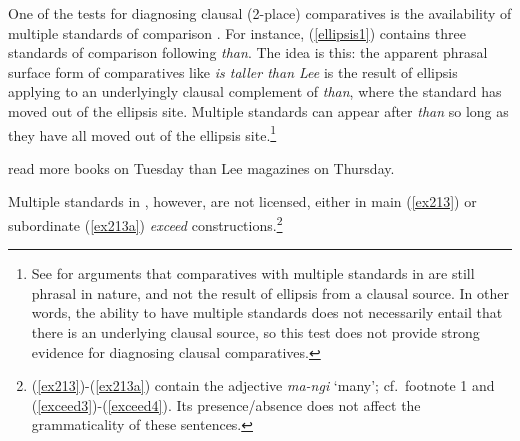 \documentclass[output=paper,
modfonts
]{langscibook}
\begin{document}
One of the tests for diagnosing clausal (2-place) comparatives is the availability of multiple standards of comparison \citep{lechner01reduced, merchant09phrasal, bhatt11reduced}. For instance, (\ref{ellipsis1}) contains three standards of comparison following {\it than}. The idea is this: the apparent phrasal surface form of comparatives like {\it {} is taller than Lee} is the result of ellipsis applying to an underlyingly clausal complement of {\it than}, where the standard has moved out of the ellipsis site. Multiple standards can appear after {\it than} so long as they have all moved out of the ellipsis site.\footnote{See \citet{lin09chinese} for arguments that comparatives with multiple standards in  are still phrasal in nature, and not the result of ellipsis from a clausal source. In other words, the ability to have multiple standards does not necessarily entail that there is an underlying clausal source, so this test does not provide strong evidence for diagnosing clausal comparatives.} 


\begin{exe}
\ex\label{ellipsis1}  read more books on Tuesday than Lee magazines on Thursday.
\end{exe}

Multiple standards in , however, are not licensed, either in main  (\ref{ex213}) or subordinate (\ref{ex213a}) {\it exceed} constructions.\footnote{(\ref{ex213})-(\ref{ex213a}) contain the adjective {\it ma-ngi} `many'; cf.~footnote 1 and (\ref{exceed3})-(\ref{exceed4}). Its presence/absence does not affect the grammaticality of these sentences.}

\begin{exe}
\label{ex213} 
\end{exe}

\begin{exe}
\label{ex213a}
\end{exe}
\end{document}
